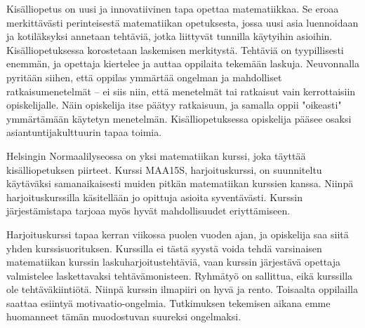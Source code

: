 Kisälliopetus on uusi ja innovatiivinen tapa opettaa matematiikkaa.
Se eroaa merkittävästi perinteisestä matematiikan opetuksesta, jossa uusi asia luennoidaan ja kotiläksyksi annetaan tehtäviä, jotka liittyvät tunnilla käytyihin asioihin.
Kisälliopetuksessa korostetaan laskemisen merkitystä.
Tehtäviä on tyypillisesti enemmän, ja opettaja kiertelee ja auttaa oppilaita tekemään laskuja.
Neuvonnalla pyritään siihen, että oppilas ymmärtää ongelman ja mahdolliset ratkaisumenetelmät -- ei siis niin, että menetelmät tai ratkaisut vain kerrottaisiin opiskelijalle.
Näin opiskelija itse päätyy ratkaisuun, ja samalla oppii "oikeasti" ymmärtämään käytetyn menetelmän.
Kisälli\-opetuksessa opiskelija pääsee osaksi asiantuntijakulttuurin tapaa toimia.\cite{hautala2012extreme,vihavainen2011extreme}

Helsingin Normaalilyseossa on yksi matematiikan kurssi, joka täyttää kisälli\-opetuksen piirteet.
Kurssi MAA15S, harjoituskurssi, on suunniteltu käytäväksi samanaikaisesti muiden pitkän matematiikan kurssien kanssa.
Niinpä harjoituskurssilla käsitellään jo opittuja asioita syventävästi.
Kurssin järjestämistapa tarjoaa myös hyvät mahdollisuudet eriyttämiseen.

Harjoituskurssi tapaa kerran viikossa puolen vuoden ajan, ja opiskelija saa siitä yhden kurssisuorituksen.
Kurssilla ei tästä syystä voida tehdä varsinaisen matematiikan kurssin laskuharjoitustehtäviä, vaan kurssin järjestävä opettaja valmistelee laskettavaksi tehtävämonisteen.
Ryhmätyö on sallittua, eikä kurssilla ole tehtäväkiintiötä.
Niinpä kurssin ilmapiiri on hyvä ja rento.
Toisaalta oppilailla saattaa esiintyä motivaatio-ongelmia.
Tutkimuksen tekemisen aikana emme huomanneet tämän muodostuvan suureksi ongelmaksi.
